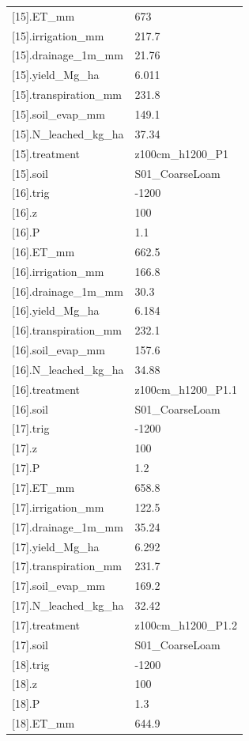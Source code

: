 {\begin{longtable}{p{}p{}}
{}[15].ET\_mm & 673\\
{}[15].irrigation\_mm & 217.7\\
{}[15].drainage\_1m\_mm & 21.76\\
{}[15].yield\_Mg\_ha & 6.011\\
{}[15].transpiration\_mm & 231.8\\
{}[15].soil\_evap\_mm & 149.1\\
{}[15].N\_leached\_kg\_ha & 37.34\\
{}[15].treatment & z100cm\_h1200\_P1\\
{}[15].soil & S01\_CoarseLoam\\
{}[16].trig & -1200\\
{}[16].z & 100\\
{}[16].P & 1.1\\
{}[16].ET\_mm & 662.5\\
{}[16].irrigation\_mm & 166.8\\
{}[16].drainage\_1m\_mm & 30.3\\
{}[16].yield\_Mg\_ha & 6.184\\
{}[16].transpiration\_mm & 232.1\\
{}[16].soil\_evap\_mm & 157.6\\
{}[16].N\_leached\_kg\_ha & 34.88\\
{}[16].treatment & z100cm\_h1200\_P1.1\\
{}[16].soil & S01\_CoarseLoam\\
{}[17].trig & -1200\\
{}[17].z & 100\\
{}[17].P & 1.2\\
{}[17].ET\_mm & 658.8\\
{}[17].irrigation\_mm & 122.5\\
{}[17].drainage\_1m\_mm & 35.24\\
{}[17].yield\_Mg\_ha & 6.292\\
{}[17].transpiration\_mm & 231.7\\
{}[17].soil\_evap\_mm & 169.2\\
{}[17].N\_leached\_kg\_ha & 32.42\\
{}[17].treatment & z100cm\_h1200\_P1.2\\
{}[17].soil & S01\_CoarseLoam\\
{}[18].trig & -1200\\
{}[18].z & 100\\
{}[18].P & 1.3\\
{}[18].ET\_mm & 644.9\\
\bottomrule\end{longtable}}

